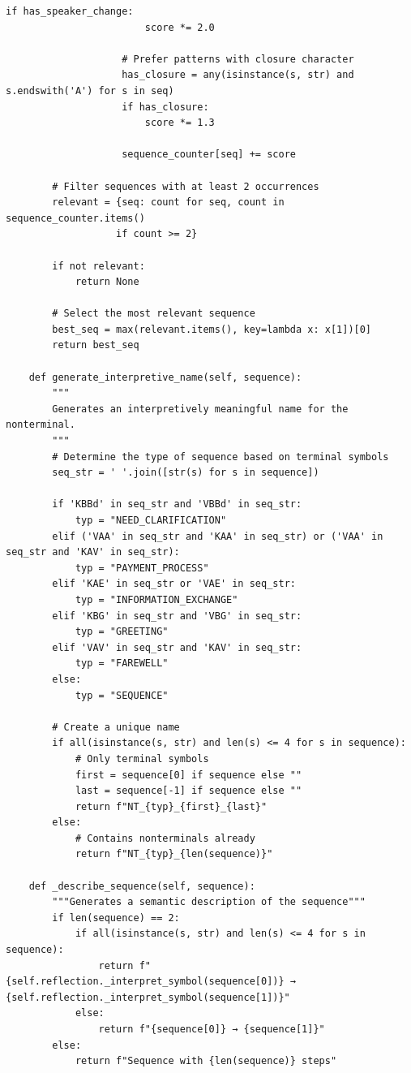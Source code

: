 \documentclass[
  12pt,
  a4paper,
  oneside,
  titlepage
]{article}
\begin{document}
\begin{lstlisting}[caption=Algorithmic Recursive Sequence Analysis 3.0 - Hierarchical Grammar Induction]
                    if has_speaker_change:
                        score *= 2.0
                    
                    # Prefer patterns with closure character
                    has_closure = any(isinstance(s, str) and s.endswith('A') for s in seq)
                    if has_closure:
                        score *= 1.3
                    
                    sequence_counter[seq] += score
        
        # Filter sequences with at least 2 occurrences
        relevant = {seq: count for seq, count in sequence_counter.items() 
                   if count >= 2}
        
        if not relevant:
            return None
        
        # Select the most relevant sequence
        best_seq = max(relevant.items(), key=lambda x: x[1])[0]
        return best_seq
    
    def generate_interpretive_name(self, sequence):
        """
        Generates an interpretively meaningful name for the nonterminal.
        """
        # Determine the type of sequence based on terminal symbols
        seq_str = ' '.join([str(s) for s in sequence])
        
        if 'KBBd' in seq_str and 'VBBd' in seq_str:
            typ = "NEED_CLARIFICATION"
        elif ('VAA' in seq_str and 'KAA' in seq_str) or ('VAA' in seq_str and 'KAV' in seq_str):
            typ = "PAYMENT_PROCESS"
        elif 'KAE' in seq_str or 'VAE' in seq_str:
            typ = "INFORMATION_EXCHANGE"
        elif 'KBG' in seq_str and 'VBG' in seq_str:
            typ = "GREETING"
        elif 'VAV' in seq_str and 'KAV' in seq_str:
            typ = "FAREWELL"
        else:
            typ = "SEQUENCE"
        
        # Create a unique name
        if all(isinstance(s, str) and len(s) <= 4 for s in sequence):
            # Only terminal symbols
            first = sequence[0] if sequence else ""
            last = sequence[-1] if sequence else ""
            return f"NT_{typ}_{first}_{last}"
        else:
            # Contains nonterminals already
            return f"NT_{typ}_{len(sequence)}"
    
    def _describe_sequence(self, sequence):
        """Generates a semantic description of the sequence"""
        if len(sequence) == 2:
            if all(isinstance(s, str) and len(s) <= 4 for s in sequence):
                return f"{self.reflection._interpret_symbol(sequence[0])} → {self.reflection._interpret_symbol(sequence[1])}"
            else:
                return f"{sequence[0]} → {sequence[1]}"
        else:
            return f"Sequence with {len(sequence)} steps"
    

\end{lstlisting}
\end{document}
